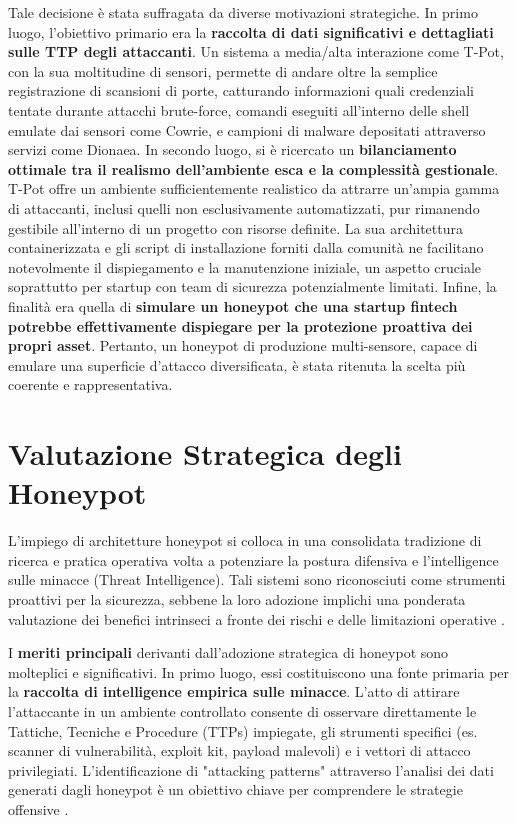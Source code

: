 Tale decisione è stata suffragata da diverse motivazioni strategiche. In primo luogo, l'obiettivo primario era la \textbf{raccolta di dati significativi e dettagliati sulle TTP degli attaccanti}. Un sistema a media/alta interazione come T-Pot, con la sua moltitudine di sensori, permette di andare oltre la semplice registrazione di scansioni di porte, catturando informazioni quali credenziali tentate durante attacchi brute-force, comandi eseguiti all'interno delle shell emulate dai sensori come Cowrie, e campioni di malware depositati attraverso servizi come Dionaea. In secondo luogo, si è ricercato un \textbf{bilanciamento ottimale tra il realismo dell'ambiente esca e la complessità gestionale}. T-Pot offre un ambiente sufficientemente realistico da attrarre un'ampia gamma di attaccanti, inclusi quelli non esclusivamente automatizzati, pur rimanendo gestibile all'interno di un progetto con risorse definite. La sua architettura containerizzata e gli script di installazione forniti dalla comunità ne facilitano notevolmente il dispiegamento e la manutenzione iniziale, un aspetto cruciale soprattutto per startup con team di sicurezza potenzialmente limitati. Infine, la finalità era quella di \textbf{simulare un honeypot che una startup fintech potrebbe effettivamente dispiegare per la protezione proattiva dei propri asset}. Pertanto, un honeypot di produzione multi-sensore, capace di emulare una superficie d'attacco diversificata, è stata ritenuta la scelta più coerente e rappresentativa.



\section{Valutazione Strategica degli Honeypot}

\label{sec:vantaggi_svantaggi}

L'impiego di architetture honeypot si colloca in una consolidata tradizione di ricerca e pratica operativa volta a potenziare la postura difensiva e l'intelligence sulle minacce (Threat Intelligence). Tali sistemi sono riconosciuti come strumenti proattivi per la sicurezza, sebbene la loro adozione implichi una ponderata valutazione dei benefici intrinseci a fronte dei rischi e delle limitazioni operative \cite{mairh2011, gadapa_sai_devineni_reddy_bommu_busi}.

I \textbf{meriti principali} derivanti dall'adozione strategica di honeypot sono molteplici e significativi. In primo luogo, essi costituiscono una fonte primaria per la \textbf{raccolta di intelligence empirica sulle minacce}. L'atto di attirare l'attaccante in un ambiente controllato consente di osservare direttamente le Tattiche, Tecniche e Procedure (TTPs) impiegate, gli strumenti specifici (es. scanner di vulnerabilità, exploit kit, payload malevoli) e i vettori di attacco privilegiati. L'identificazione di "attacking patterns" attraverso l'analisi dei dati generati dagli honeypot è un obiettivo chiave per comprendere le strategie offensive \cite{mairh2011, gadapa_sai_devineni_reddy_bommu_busi}.

